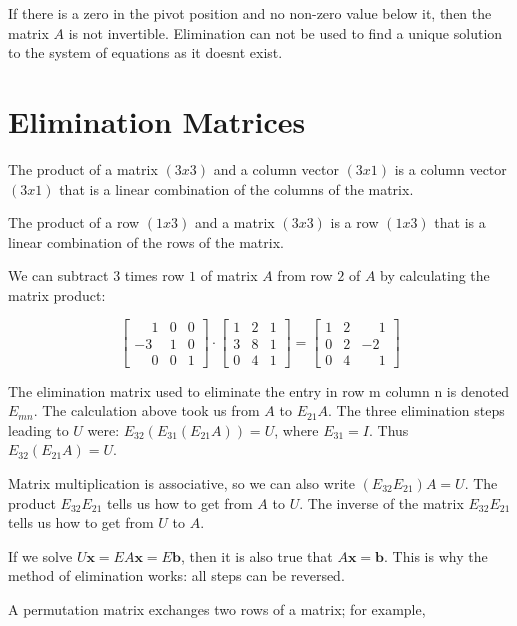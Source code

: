 \documentclass{ximera}
\begin{document}
If there is a zero in the pivot position and no non-zero value below it, 
then the matrix $A$ is not invertible. Elimination can not be used to find a 
unique solution to the system of equations as it doesnt exist.

\section*{Elimination Matrices}

The product of a matrix $(3x3)$ and a column vector $(3x1)$ is a column vector 
$(3x1)$ that is a linear combination of the columns of the matrix.

The product of a row $(1x3)$ and a matrix $(3x3)$ is a row $(1x3)$ that is a linear
combination of the rows of the matrix.

We can subtract $3$ times row $1$ of matrix $A$ from row $2$ of $A$ by calculating 
the matrix product:

\[
\begin{bmatrix} \phantom{-}1&0&0\\-3&1&0\\\phantom{-}0&0&1 \end{bmatrix}
\cdot 
\begin{bmatrix} 1&2&1\\3&8&1\\0&4&1 \end{bmatrix} =
\begin{bmatrix} 1&2&\phantom{-}1\\0&2&-2\\0&4&\phantom{-}1 \end{bmatrix}
\]

The elimination matrix used to eliminate the entry in row m column n is denoted $E_{mn}$. 
The calculation above took us from $A$ to $E_{21}A$. The three elimination steps 
leading to $U$ were: $E_{32}(E_{31}(E_{21}A)) = U$, where $E_{31} = I$. Thus 
$E_{32}(E_{21}A) = U$.

Matrix multiplication is associative, so we can also write $(E_{32}E_{21})A = U$. 
The product $E_{32}E_{21}$ tells us how to get from $A$ to $U$. The inverse of the matrix 
$E_{32}E_{21}$ tells us how to get from $U$ to $A$.

If we solve $U\mathbf{x} = EA\mathbf{x} = E\mathbf{b}$, then it is also true that 
$A\mathbf{x} = \mathbf{b}$. This is why the method of elimination works: all steps 
can be reversed.

A permutation matrix exchanges two rows of a matrix; for example,
\end{document}
